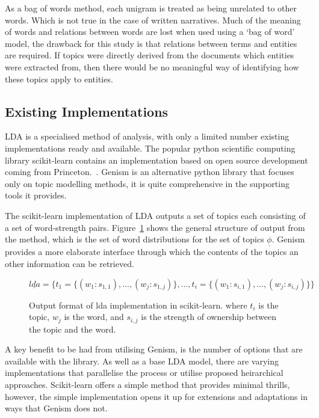 \documentclass[10pt]{report}
\begin{document}
As a bag of words method, each unigram is treated as being unrelated to other words. Which is not true in the case of written narratives. Much of the meaning of words and relations between words are lost when used using a ‘bag of word’ model, the drawback for this study is that relations between terms and entities are required. If topics were directly derived from the documents which entities were extracted from, then there would be no meaningful way of identifying how these topics apply to entities.

\subsection{Existing Implementations}

LDA is a specialised method of analysis, with only a limited number existing implementations ready and available. The popular python scientific computing library scikit-learn contains an implementation based on open source development coming from Princeton.~\cite{scikit-learn, Hoffman_undated-nx}. Genism is an alternative python library that focuses only on topic modelling methods, it is quite comprehensive in the supporting tools it provides.~\cite{rehurek_lrec}

The scikit-learn implementation of LDA outputs a set of topics each consisting of a set of word-strength pairs. Figure~\ref{fig:lda_sklearn_output} shows the general structure of output from the method, which is the set of word distributions for the set of topics $\underline\phi$. Genism provides a more elaborate interface through which the contents of the topics an other information can be retrieved. 
\renewcommand{\baselinestretch}{1.0}\normalsize
\begin{figure}[h!]
\[
  \underline{lda} = \{t_1 = \{(w_1 : s_{1,1}), ..., (w_j : s_{1,j})\}, ..., t_i =\{(w_1 : s_{i,1}), ..., (w_j : s_{i,j})\}\}
\]
\caption{Output format of lda implementation in scikit-learn. where \(t_i\) is the topic, \(w_j\) is the word, and \(s_{i,j}\) is the strength of ownership between the topic and the word. \label{fig:lda_sklearn_output}}
\end{figure}
\renewcommand{\baselinestretch}{2.0}\normalsize
A key benefit to be had from utilising Genism, is the number of options that are available with the library. As well as a base LDA model, there are varying implementations that parallelise the process or utilise proposed heirarchical approaches. Scikit-learn offers a simple method that provides minimal thrills, however, the simple implementation opens it up for extensions and adaptations in ways that Genism does not.
\end{document}
